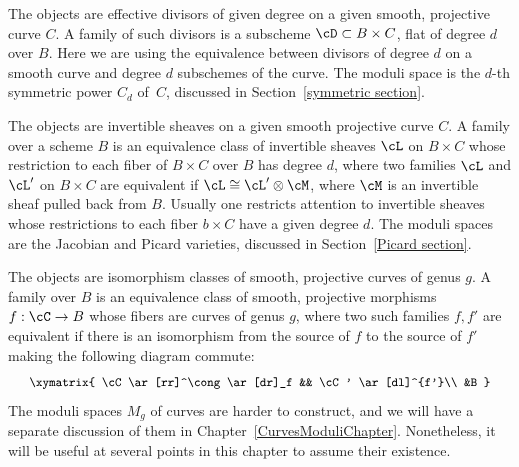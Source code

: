 
\begin{example} The objects are
%
%
effective divisors of given degree on a given smooth, projective curve
$C$. A family of such divisors is a subscheme $\cD \subset B \times C$,
flat of degree $d$ over $B$.
Here we are using
the equivalence between divisors of degree $d$ on a smooth curve and
degree $d$ subschemes of the curve. The moduli space is the $d$-th
symmetric power
%
$C_d$ of~$C$, discussed in Section~\ref{symmetric section}.
\end{example}

\begin{example} The objects are
%
invertible sheaves on a given smooth projective curve $C$. A family
over a scheme $B$ is an equivalence class of invertible sheaves $\cL$
on $B \times C$ whose restriction to each fiber of $B \times C$ over
$B$ has degree $d$, where two families $\cL$ and $\cL'$ on $B \times
C$ are equivalent if $\cL\cong \cL' \otimes \cM$, where $\cM$ is  an
invertible sheaf pulled back from $B$. Usually one restricts attention
to invertible sheaves
whose restrictions to each fiber $b\times C$ have a given degree $d$.
%
%
The moduli spaces are the Jacobian and Picard varieties,
discussed in
Section~\ref{Picard section}.
\end{example}

\begin{example} The objects are isomorphism
%
classes of smooth, projective curves of genus $g$. A family over $B$
is an equivalence class of smooth, projective morphisms $f : \cC \to B$
whose fibers are curves of genus $g$, where two such families $f, f'$
are equivalent if there is an isomorphism from the source of $f$ to
the source
of $f'$ making the
following diagram commute:
\vspace*{2pt}
$$
\vspace*{2pt}
\small
\xymatrix{
\cC  \ar[rr]^\cong \ar[dr]_f && \cC' \ar[dl]^{f'}\\
&B
}
$$
The moduli spaces $M_g$ of curves are harder to construct, and we will
have a separate discussion of them in
Chapter~\ref{CurvesModuliChapter}. Nonetheless,
it will be useful at several points in this chapter to assume their
existence.
\end{example}

